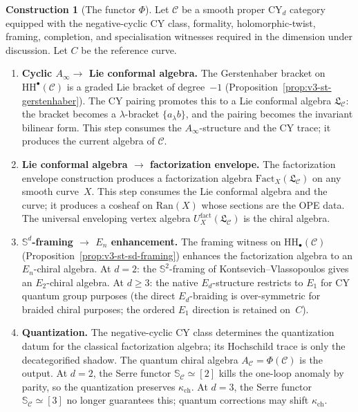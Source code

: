 \documentclass[11pt]{article}
\theoremstyle{plain}
\theoremstyle{definition}
\newtheorem{construction}[theorem]{Construction}
\theoremstyle{remark}
\newcommand{\fL}{\mathfrak{L}}
\newcommand{\Ran}{\mathrm{Ran}}
\newcommand{\cC}{\mathcal{C}}
\newcommand{\bS}{\mathbb{S}}
\newcommand{\Ainf}{A_\infty}
\newcommand{\Eone}{E_1}
\newcommand{\Etwo}{E_2}
\newcommand{\En}{E_n}
\newcommand{\Sd}{\bS^d}
\newcommand{\HH}{\mathrm{HH}}
\newcommand{\Fact}{\mathrm{Fact}}
\begin{document}
\begin{construction}[The functor $\Phi$]
\label{con:v3-st-phi}
Let $\cC$ be a smooth proper CY$_d$ category equipped with the
negative-cyclic CY class, formality, holomorphic-twist, framing,
completion, and specialisation witnesses required in the dimension
under discussion.  Let $C$ be the reference curve.
\begin{enumerate}[label=\textbf{\arabic*.}]
 \item \textbf{Cyclic $\Ainf \to$ Lie conformal algebra.}
 The Gerstenhaber bracket on $\HH^\bullet(\cC)$ is a graded Lie
 bracket of degree~$-1$ (Proposition~\ref{prop:v3-st-gerstenhaber}).
 The CY pairing promotes this to a Lie conformal algebra
 $\fL_\cC$: the bracket becomes a $\lambda$-bracket
 $\{a_\lambda b\}$, and the pairing becomes the invariant
 bilinear form.  This step consumes the $\Ainf$-structure and
 the CY trace; it produces the current algebra of $\cC$.

 \item \textbf{Lie conformal algebra $\to$ factorization
 envelope.}
 The factorization envelope construction produces a factorization
 algebra $\Fact_X(\fL_\cC)$ on any smooth curve~$X$.  This step
 consumes the Lie conformal algebra and the curve; it produces a
 cosheaf on $\Ran(X)$ whose sections are the OPE data.  The
 universal enveloping vertex algebra $U_X^{\mathrm{fact}}(\fL_\cC)$
 is the chiral algebra.

 \item \textbf{$\Sd$-framing $\to$ $\En$ enhancement.}
 The framing witness on $\HH_\bullet(\cC)$
 (Proposition~\ref{prop:v3-st-sd-framing}) enhances the
 factorization algebra to an $\En$-chiral algebra.  At $d = 2$:
 the $\bS^2$-framing of Kontsevich--Vlassopoulos gives an
 $\Etwo$-chiral algebra.  At $d \geq 3$: the native $E_d$-structure
 restricts to $\Eone$ for CY quantum group purposes (the direct
 $E_d$-braiding is over-symmetric for braided chiral purposes; the
 ordered $\Eone$ direction is retained on~$C$).

 \item \textbf{Quantization.}
 The negative-cyclic CY class determines the quantization datum for
 the classical factorization algebra; its Hochschild trace is only the
 decategorified shadow.  The
 quantum chiral algebra $A_\cC = \Phi(\cC)$ is the output.  At
 $d = 2$, the Serre functor $\bS_\cC \simeq [2]$ kills the
 one-loop anomaly by parity, so the quantization preserves
 $\kappa_{\mathrm{ch}}$.  At $d = 3$, the Serre functor
 $\bS_\cC \simeq [3]$ no longer guarantees this; quantum
 corrections may shift $\kappa_{\mathrm{ch}}$.
\end{enumerate}
\end{construction}
\end{document}
